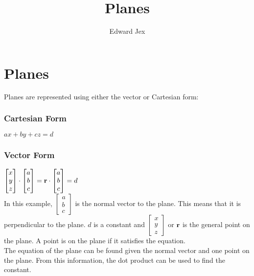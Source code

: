 \documentclass[a4paper,12pt]{article}
\begin{document}
\title{Planes}	
\author{Edward Jex}
\maketitle

\section*{Planes}
Planes are represented using either the vector or Cartesian form: \\
\subsubsection*{Cartesian Form}
$ax + by + cz = d$
\subsubsection*{Vector Form}
$\begin{bmatrix} x \\ y \\ z \end{bmatrix} \cdot 
\begin{bmatrix} a \\ b \\ c \end{bmatrix} = 
\bold{r} \cdot 
\begin{bmatrix} a \\ b \\ c \end{bmatrix} =  d$ \\

In this example, $\begin{bmatrix} a \\ b \\ c \end{bmatrix}$ is the normal vector to the plane. This means that it is perpendicular to the plane. $d$ is a constant and $\begin{bmatrix} x \\ y \\ z \end{bmatrix}$ or $\bold{r}$ is the general point on the plane. A point is on the plane if it satisfies the equation. \\

The equation of the plane can be found given the normal vector and one point on the plane. From this information, the dot product can be used to find the constant. 
\end{document}
